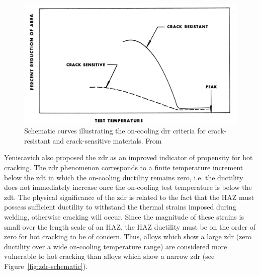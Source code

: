 \begin{figure}
\centering
\includegraphics[width=6in]{figures/yeniscavich-drr.png}
\caption{Schematic curves illustrating the on-cooling \acrshort{drr} criteria for crack-resistant and crack-sensitive materials.  From \citet[Fig.~2]{yeniscavich_correlation_1970}}
\label{fig:drr-schematic}
\end{figure}

Yeniscavich also proposed the \gls{zdr} as an improved indicator of propensity for hot cracking. The \gls{zdr} phenomenon corresponds to a finite temperature increment below the \gls{zdt} in which the on-cooling ductility remains zero, i.e. the ductility does not immediately increase once the on-cooling test temperature is below the \gls{zdt}. The physical significance of the \gls{zdr} is related to the fact that the HAZ must possess sufficient ductility to withstand the thermal strains imposed during welding, otherwise cracking will occur. Since the magnitude of these strains is small over the length scale of an HAZ, the HAZ ductility must be on the order of zero for hot cracking to be of concern. Thus, alloys which show a large \gls{zdr} (zero ductility over a wide on-cooling temperature range) are considered more vulnerable to hot cracking than alloys which show a narrow \gls{zdr} (see Figure~\ref{fig:zdr-schematic}).

